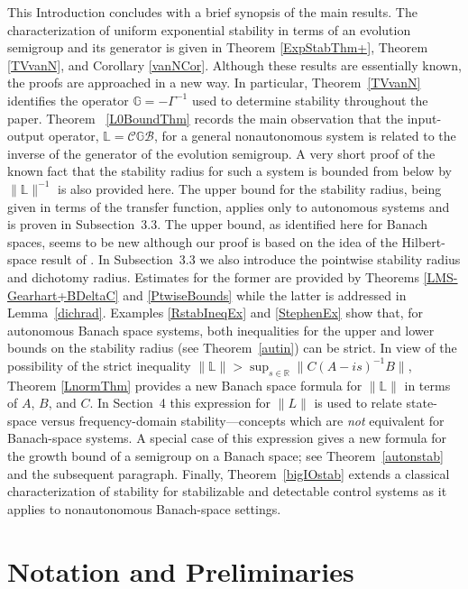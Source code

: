 \documentclass[10pt,psamsfonts,leqno]{siamltex}
\newcommand{\bbR}{\mathbb{R}}
\newcommand{\bbL}{\mathbb{L}}
\newcommand{\bbG}{\mathbb{G}}
\newcommand{\calB}{\mathcal{B}}
\newcommand{\calC}{\mathcal{C}}
\begin{document}
This Introduction concludes with a brief synopsis of the main results.
The characterization of uniform exponential stability
in terms of an evolution semigroup and its generator
is given in Theorem \ref{ExpStabThm+}, Theorem \ref{TVvanN}, and
Corollary \ref{vanNCor}.  Although these results are essentially known,
the proofs are approached in a new way.  In particular,
Theorem~\ref{TVvanN} identifies the operator $\bbG=-\Gamma^{-1}$  used
to determine
stability throughout the paper.
Theorem~ \ref{L0BoundThm} records the
 main observation that the input-output operator,
$\bbL=\calC\bbG\calB$, for a general nonautonomous system is related
to the inverse of the generator of the evolution semigroup.
A very short proof of the known fact that the stability radius
for such a system
is bounded from below by $\|{\mathbb L}\|^{-1}$ is also provided here.
The upper bound for the stability radius,
being given in terms of the transfer function, applies only
to autonomous systems and is proven in Subsection~3.3.
The upper bound, as identified here for Banach spaces,
seems to be new although
our proof is based on the idea of the
Hilbert-space result of \cite[Thm.~3.5]{HP94}.
In Subsection~3.3 we also
introduce the  pointwise stability radius and
dichotomy radius.  Estimates for the former are provided by
 Theorems \ref{LMS-Gearhart+BDeltaC} and \ref{PtwiseBounds} while the
latter is addressed in Lemma~\ref{dichrad}.
Examples \ref{RstabIneqEx} and \ref{StephenEx} show that,
for autonomous Banach space systems, both
inequalities for the upper and lower bounds on the stability radius
(see Theorem~\ref{autin}) can be strict.
In view of the
possibility of the
strict inequality
$\|\bbL\|>\sup_{s\in\bbR}\|C(A-is)^{-1}B\|$,
Theorem \ref{LnormThm} provides a new Banach space formula for
$\|\bbL\|$ in terms of $A$, $B$, and $C$.
In  Section~4 this expression
for $\|L\|$ is used to relate state-space versus frequency-domain
stability---concepts which are {\em not} equivalent for Banach-space
systems.
A special case of this expression gives a new formula
for the growth bound of a semigroup on a Banach space; see
Theorem~\ref{autonstab} and the subsequent paragraph.
Finally, Theorem~\ref{bigIOstab}  extends a classical
characterization of stability for stabilizable and detectable control
systems as it applies to nonautonomous Banach-space settings.


\section{Notation and Preliminaries}
\end{document}
